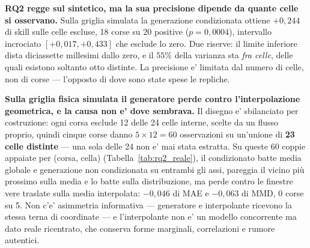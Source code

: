 \documentclass[10pt,conference,a4paper,twocolumn]{IEEEtran}
\begin{document}
\textbf{RQ2 regge sul sintetico, ma la sua precisione dipende da quante celle si osservano.} Sulla griglia simulata la generazione condizionata ottiene $+0{,}244$ di skill sulle celle escluse, 18 corse su 20 positive ($p = 0{,}0004$), intervallo incrociato $[+0{,}017, +0{,}433]$ che esclude lo zero. Due riserve: il limite inferiore dista diciassette millesimi dallo zero, e il $55\%$ della varianza sta \emph{fra celle}, delle quali esistono soltanto otto distinte. La precisione e' limitata dal numero di celle, non di corse — l'opposto di dove sono state spese le repliche.

\textbf{Sulla griglia fisica simulata il generatore perde contro l'interpolazione geometrica, e la causa non e' dove sembrava.} Il disegno e' sbilanciato per costruzione: ogni corsa esclude 12 delle 24 celle interne, scelte da un flusso proprio, quindi cinque corse danno $5 \times 12 = 60$ osservazioni su un'unione di \textbf{23 celle distinte} — una sola delle 24 non e' mai stata estratta. Su queste 60 coppie appaiate per (corsa, cella) (Tabella~\ref{tab:rq2_reale}), il condizionato batte media globale e generazione non condizionata su entrambi gli assi, pareggia il vicino più prossimo sulla media e lo batte sulla distribuzione, ma perde contro le finestre vere traslate sulla media interpolata: $-0{,}046$ di MAE e $-0{,}063$ di MMD, 0 corse su 5. Non c'e' asimmetria informativa — generatore e interpolante ricevono la stessa terna di coordinate — e l'interpolante non e' un modello concorrente ma dato reale ricentrato, che conserva forme marginali, correlazioni e rumore autentici.
\end{document}
